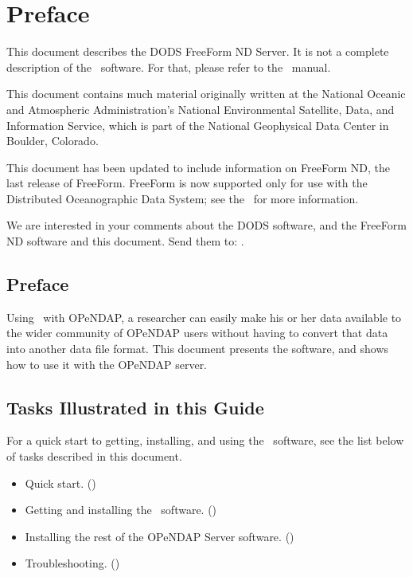 %
%

\T\chapter*{Preface}
\T{}

This document describes the DODS FreeForm ND Server.  It is not a
complete description of the \ffnd\ software.  For that, please refer
to the \ffnd\ manual.

This document contains much material originally written at the
National Oceanic and Atmospheric Administration's National
Environmental Satellite, Data, and Information Service, which is part
of the National Geophysical Data Center in Boulder, Colorado.

This document has been updated to include information on FreeForm ND,
the last release of FreeForm. FreeForm is now supported only for use
with the Distributed Oceanographic Data System; see the 
\DODShome\ for more information.

We are interested in your comments about the DODS software, and the
FreeForm ND software and this document.  Send them to:
.

\begin{ifhtml}
  \chapter*{Preface}
\end{ifhtml}

Using \ffnd\ with OPeNDAP, a researcher can easily make his or her data
available to the wider community of OPeNDAP users without having to
convert that data into another data file format.  This document
presents the \ffnd software, and shows how to use it with the OPeNDAP server.

\section{Tasks Illustrated in this Guide}
\label{pref,tasks}

For a quick start to getting, installing, and using the \ffnd\
software, see the list below of tasks described in this document.

\begin{itemize}

\item Quick start. ()

\item Getting and installing the \ffnd\ software. 
()

\item Installing the rest of the OPeNDAP Server software. 
()

\item Troubleshooting. (\pagexref{a})

\end{itemize}



